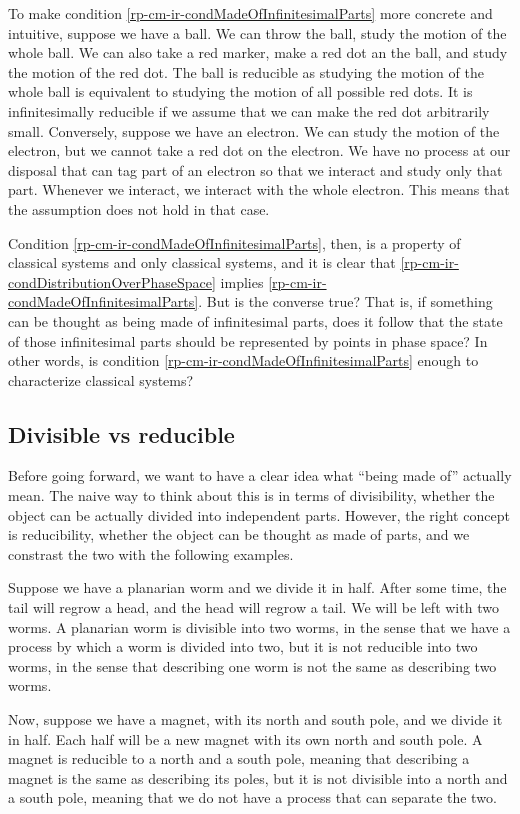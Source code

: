 To make condition \ref{rp-cm-ir-condMadeOfInfinitesimalParts} more concrete and intuitive, suppose we have a ball. We can throw the ball, study the motion of the whole ball. We can also take a red marker, make a red dot an the ball, and study the motion of the red dot. The ball is reducible as studying the motion of the whole ball is equivalent to studying the motion of all possible red dots. It is infinitesimally reducible if we assume that we can make the red dot arbitrarily small. Conversely, suppose we have an electron. We can study the motion of the electron, but we cannot take a red dot on the electron. We have no process at our disposal that can tag part of an electron so that we interact and study only that part. Whenever we interact, we interact with the whole electron. This means that the assumption does not hold in that case.

Condition \ref{rp-cm-ir-condMadeOfInfinitesimalParts}, then, is a property of classical systems and only classical systems, and it is clear that \ref{rp-cm-ir-condDistributionOverPhaseSpace} implies \ref{rp-cm-ir-condMadeOfInfinitesimalParts}. But is the converse true? That is, if something can be thought as being made of infinitesimal parts, does it follow that the state of those infinitesimal parts should be represented by points in phase space? In other words, is condition \ref{rp-cm-ir-condMadeOfInfinitesimalParts} enough to characterize classical systems?

\subsection{Divisible vs reducible}

Before going forward, we want to have a clear idea what ``being made of'' actually mean. The naive way to think about this is in terms of divisibility, whether the object can be actually divided into independent parts. However, the right concept is reducibility, whether the object can be thought as made of parts, and we constrast the two with the following examples.

Suppose we have a planarian worm and we divide it in half. After some time, the tail will regrow a head, and the head will regrow a tail. We will be left with two worms. A planarian worm is divisible into two worms, in the sense that we have a process by which a worm is divided into two, but it is not reducible into two worms, in the sense that describing one worm is not the same as describing two worms.

Now, suppose we have a magnet, with its north and south pole, and we divide it in half. Each half will be a new magnet with its own north and south pole. A magnet is reducible to a north and a south pole, meaning that describing a magnet is the same as describing its poles, but it is not divisible into a north and a south pole, meaning that we do not have a process that can separate the two.

